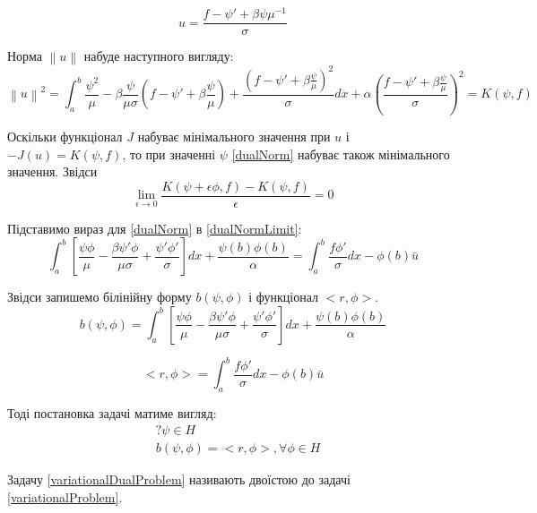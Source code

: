 \documentclass[a4paper]{article}
\newcommand\norm[1]{\left\lVert#1\right\rVert}
\numberwithin{equation}{section}
\begin{document}
\begin{equation}
u = \frac {f - \psi' + \beta \psi \mu ^{-1} } {\sigma}
\end{equation}

Норма $\norm{u}$ набуде наступного вигляду:
\begin{equation} \label{dualNorm}
\norm{u}^2 = \int_a^b \frac{\psi^2} {\mu} - \beta \frac {\psi} {\mu \sigma} (f - \psi' + \beta \frac {\psi} {\mu}) + \frac {(f - \psi' + \beta \frac {\psi} {\mu})^2} {\sigma} dx + \alpha (\frac {f - \psi' + \beta \frac {\psi} {\mu}} {\sigma})^2 = K(\psi, f)
\end{equation}

Оскільки функціонал $J$ набуває мінімального значення при $u$ і $-J(u) = K(\psi, f)$, то при значенні $\psi$ \ref{dualNorm} набуває також мінімального значення. Звідси 
\begin{equation} \label{dualNormLimit}
\lim_{\epsilon \to 0} \frac {K(\psi + \epsilon \phi, f) - K(\psi, f)} {\epsilon} = 0
\end{equation}

Підставимо вираз для \ref{dualNorm} в \ref{dualNormLimit}:
\begin{equation}
\int_a^b [ \frac{\psi \phi}{\mu} - \frac{\beta \psi' \phi}{\mu \sigma} + \frac{\psi' \phi'}{\sigma} ]dx + \frac{\psi(b) \phi(b)}{\alpha} = \int_a^b \frac{f \phi'}{\sigma}dx - \phi(b) \bar{u}
\end{equation}

Звідси запишемо білінійну форму $b(\psi, \phi)$ і функціонал $<r,\phi>$.
\begin{equation}
b(\psi, \phi) = \int_a^b [ \frac{\psi \phi}{\mu} - \frac{\beta \psi' \phi}{\mu \sigma} + \frac{\psi' \phi'}{\sigma} ]dx + \frac{\psi(b) \phi(b)}{\alpha}
\end{equation}

\begin{equation}
<r, \phi> = \int_a^b \frac{f \phi'}{\sigma}dx - \phi(b) \bar{u}
\end{equation}

Тоді постановка задачі матиме вигляд:
\begin{equation}\label{variationalDualProblem}
\begin{split}
&? \psi \in H
\\& b(\psi, \phi) = <r, \phi>, \forall \phi \in H
\end{split}
\end{equation}

Задачу \ref{variationalDualProblem} називають двоїстою до задачі \ref{variationalProblem}.
\end{document}
